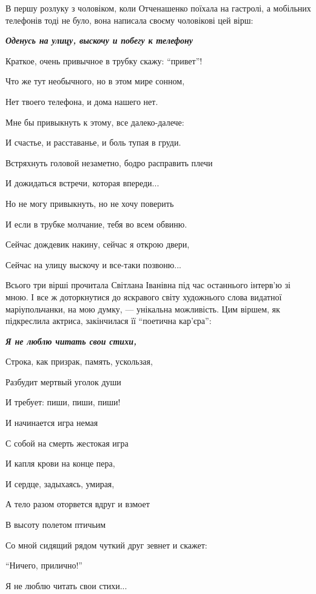 В першу розлуку з чоловіком, коли Отченашенко поїхала на гастролі, а мобільних
телефонів тоді не було, вона написала своєму чоловікові цей вірш: 

\begin{center}
  \em\color{blue}\bfseries
Оденусь на улицу, выскочу и побегу к телефону

Краткое, очень привычное в трубку скажу: \enquote{привет}!

Что же тут необычного, но в этом мире сонном,

Нет твоего телефона, и дома нашего нет.

Мне бы привыкнуть к этому, все далеко-далече:

И счастье, и расставанье, и боль тупая в груди.

Встряхнуть головой незаметно, бодро расправить плечи

И дожидаться встречи, которая впереди...

Но не могу привыкнуть, но не хочу поверить

И если в трубке молчание, тебя во всем обвиню.

Сейчас дождевик накину, сейчас я открою двери,

Сейчас на улицу выскочу и все-таки позвоню... 
\end{center}

Всього три вірші прочитала Світлана Іванівна під час останнього інтерв'ю зі
мною. І все ж доторкнутися до яскравого світу художнього слова видатної
маріупольчанки, на мою думку, — унікальна можливість. Цим віршем, як
підкреслила актриса, закінчилася її \enquote{поетична кар'єра}:

\begin{center}
  \em\color{blue}\bfseries
Я не люблю читать свои стихи,

Строка, как призрак, память, ускользая,

Разбудит мертвый уголок души

И требует: пиши, пиши, пиши!

И начинается игра немая

С собой на смерть жестокая игра

И капля крови на конце пера,

И сердце, задыхаясь, умирая,

А тело разом оторвется вдруг и взмоет

В высоту полетом птичьим

Со мной сидящий рядом чуткий друг зевнет и скажет:

\enquote{Ничего, прилично!}

Я не люблю читать свои стихи...
\end{center}

